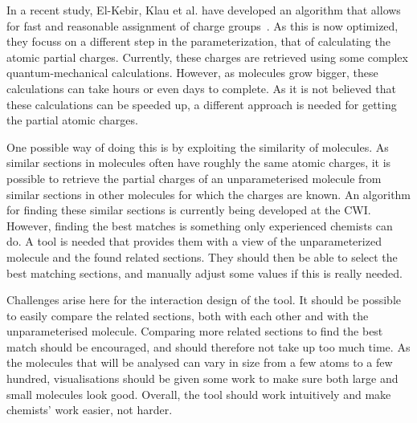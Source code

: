 In a recent study, El-Kebir, Klau et al. have developed an algorithm that allows for fast and reasonable assignment of charge groups~\cite{canzar2012charge}. As this is now optimized, they focuss on a different step in the parameterization, that of calculating the atomic partial charges. Currently, these charges are retrieved using some complex quantum-mechanical calculations. However, as molecules grow bigger, these calculations can take hours or even days to complete. As it is not believed that these calculations can be speeded up, a different approach is needed for getting the partial atomic charges.

One possible way of doing this is by exploiting the similarity of molecules. As similar sections in molecules often have roughly the same atomic charges, it is possible to retrieve the partial charges of an unparameterised molecule from similar sections in other molecules for which the charges are known. An algorithm for finding these similar sections is currently being developed at the CWI. However, finding the best matches is something only experienced chemists can do. A tool is needed that provides them with a view of the unparameterized molecule and the found related sections. They should then be able to select the best matching sections, and manually adjust some values if this is really needed.

Challenges arise here for the interaction design of the tool. It should be possible to easily compare the related sections, both with each other and with the unparameterised molecule. Comparing more related sections to find the best match should be encouraged, and should therefore not take up too much time. As the molecules that will be analysed can vary in size from a few atoms to a few hundred, visualisations should be given some work to make sure both large and small molecules look good. Overall, the tool should work intuitively and make chemists' work easier, not harder.

